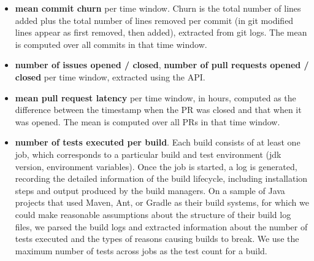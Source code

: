 \begin{itemize}

\item \textbf{mean commit churn} per time window.
Churn is the total number of lines added plus the total number
of lines removed per commit (in git modified lines appear as first removed, 
then added), extracted from git logs.
The mean is computed over all commits in that time window.

\item \textbf{number of issues opened / closed}, \textbf{number of pull requests
opened / closed} per time window, extracted using the \GH API.

\item \textbf{mean pull request latency} per time window, in hours, computed 
as the difference between the timestamp when the PR was closed and that 
when it was opened.
The mean is computed over all PRs in that time window.

\item \textbf{number of tests executed per build}. 
Each \Tvis build consists of at least one job, which corresponds to a particular
build and test environment (\eg jdk version, environment variables). 
Once the job is started, a log is generated, recording the detailed information
of the build lifecycle, including installation steps and output produced by the 
build managers.
On a sample of Java projects that used Maven, Ant, or Gradle as their build
systems, for which we could make reasonable assumptions about the structure 
of their build log files, we parsed the \Tvis build logs and extracted information 
about the number of tests executed and the types of reasons causing builds to 
break.
We use the maximum number of tests across jobs as the test count for a build. 

\end{itemize}





